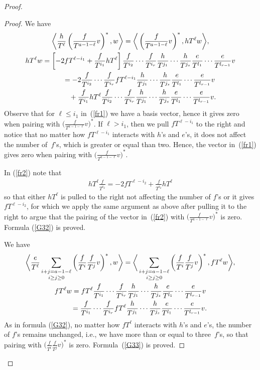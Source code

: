\documentclass[11pt]{article}
\numberwithin{equation}{section}
\begin{document}
\begin{proof}
\begin{proof}
We have
\begin{gather}
 \bigg\langle \frac{h}{T^\ell} \left(\frac{f}{T^{a-1-\ell}}v\right)^*, w \bigg\rangle = \bigg\langle \left(\frac{f}{T^{a-1-\ell}}v\right)^*, hT^{\ell} w \bigg\rangle,\nonumber\\
hT^{\ell} w = \left[-2 fT^{\ell-i_1}+ \frac{f}{T^{i_1}} hT^{\ell} \right] \frac{f}{T^{i_2}}\cdots\frac{f}{T^{i_r}} \frac{h}{T^{j_1}}\cdots\frac{h}{T^{j_s}} \frac{e}{T^{l_1}}\cdots\frac{e}{T^{l_{r-1}}} v \nonumber \\
\hphantom{hT^{\ell} w} = -2 \frac{f}{T^{i_2}}\cdots\frac{f}{T^{i_r}} fT^{\ell-i_1} \frac{h}{T^{j_1}}\cdots\frac{h}{T^{j_s}} \frac{e}{T^{l_1}}\cdots\frac{e}{T^{l_{r-1}}} v \label{fr1} \\
\hphantom{hT^{\ell} w=} + \frac{f}{T^{i_1}} hT^{\ell} \frac{f}{T^{i_2}}\cdots\frac{f}{T^{i_r}} \frac{h}{T^{j_1}}\cdots\frac{h}{T^{j_s}} \frac{e}{T^{l_1}}\cdots\frac{e}{T^{l_{r-1}}} v. \label{fr2}
\end{gather}
Observe that for $\ell \leq i_1$ in~(\ref{fr1}) we have a basis vector, hence it gives zero when pairing with $\big(\frac{f}{T^{a-1-\ell}}v\big)^*$. If $\ell > i_1$, then we pull $fT^{\ell-i_1}$ to the right and notice that no matter how $fT^{\ell-i_1}$ interacts with $h$'s and $e$'s, it does not affect the number of~$f$'s, which is greater or equal than two. Hence, the vector in~(\ref{fr1}) gives zero when pairing with $\big(\frac{f}{T^{a-1-\ell}}v\big)^*$.

In (\ref{fr2}) note that
\begin{gather*}
hT^{\ell} \frac{f}{T^{i_2}} = -2 fT^{\ell-i_2} + \frac{f}{T^{i_2}} hT^{\ell}
\end{gather*}
so that either $hT^{\ell}$ is pulled to the right not affecting the number of $f$'s or it gives $fT^{\ell-i_2}$, for which we apply the same argument as above after pulling it to the right to argue that the pairing of the vector in~(\ref{fr2}) with $\big(\frac{f}{T^{a-1-\ell}}v\big)^*$ is zero. Formula (\ref{G32}) is proved.

We have
\begin{gather*}
\bigg\langle \frac{e}{T^{\ell}} \mathop{\sum_{i+j=a-1-\ell}}_{i\geq j\geq 0} \left(\frac{f}{T^i}\frac{f}{T^j}v\right)^*, w \bigg\rangle = \bigg\langle \mathop{\sum_{i+j=a-1-\ell}}_{i\geq j\geq 0} \left(\frac{f}{T^i}\frac{f}{T^j}v\right)^*, fT^{\ell} w \bigg\rangle, \\
fT^{\ell} w = fT^{\ell} \frac{f}{T^{i_1}}\cdots\frac{f}{T^{i_r}}
\frac{h}{T^{j_1}}\cdots\frac{h}{T^{j_s}} \frac{e}{T^{l_1}}\cdots\frac{e}{T^{l_{r-1}}} v \\
\hphantom{fT^{\ell} w} = \frac{f}{T^{i_1}}\cdots\frac{f}{T^{i_r}} fT^{\ell}
\frac{h}{T^{j_1}}\cdots\frac{h}{T^{j_s}} \frac{e}{T^{l_1}}\cdots\frac{e}{T^{l_{r-1}}} v.
\end{gather*}
As in formula (\ref{G32}), no matter how $fT^{\ell}$ interacts with $h$'s and $e$'s, the number of $f$'s remains unchanged, i.e., we have more than or equal to three~$f$'s, so that pairing with $\big(\frac{f}{T^i}\frac{f}{T^j}v\big)^*$ is zero. Formula~(\ref{G33}) is proved.
\end{proof}


\end{proof}
\end{document}
